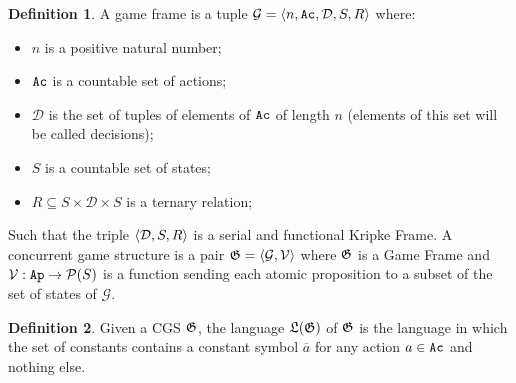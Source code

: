 \documentclass{article}
\theoremstyle{definition}
\newtheorem{definition}{Definition}[section]
\begin{document}
\begin{definition}
    A game frame is a tuple $\mathcal{G}=\langle n,\texttt{Ac}, \mathcal{D}, S,R  \rangle$ where: 
    \begin{itemize}
        \item $n$ is a positive natural number; 
        \item $\texttt{Ac}$ is a countable set of actions; 
        \item $\mathcal{D}$ is the set of tuples of elements of $\texttt{Ac}$ of length $n$ (elements of this set will be called decisions); 
        \item $S$ is a countable  set of states; 
        \item $R\subseteq S \times \mathcal{D}\times S$ is a ternary relation; 
        
    \end{itemize}
    
    Such that the triple $\langle \mathcal{D}, S, R \rangle$ is a serial and functional Kripke Frame. A concurrent game structure is a pair $\mathfrak{G}=\langle \mathcal{G},\mathcal{V} \rangle$ where $\mathfrak{G}$ is a Game Frame and $\mathcal{V}: \texttt{Ap} \to \mathcal{P}(S)$ is a function sending each atomic proposition to a subset of the set of states of $\mathcal{G}$. 
\end{definition}




    
     
 




\begin{definition}
    Given a CGS $\mathfrak{G}$, the language  $\mathfrak{L}(\mathfrak{G})$ of $\mathfrak{G}$ is the language in which the set of constants contains a constant symbol $\overline{a}$ for any action $a\in \texttt{Ac}$ and nothing else. 
 \end{definition}
\end{document}
